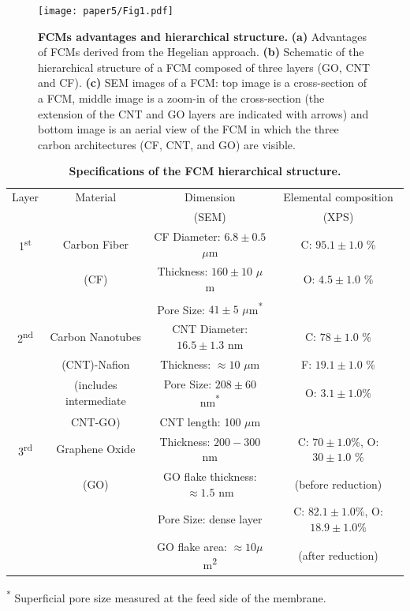 \begin{figure}%
  \centering
  \texttt{[image: paper5/Fig1.pdf]}
  \caption{\textbf{FCMs advantages and hierarchical structure.} \textbf{(a)} Advantages of FCMs derived from the Hegelian approach. \textbf{(b)} Schematic of the hierarchical structure of a FCM composed of three layers (GO, CNT and CF). \textbf{(c)} SEM images of a FCM: top image is a cross-section of a FCM, middle image is a zoom-in of the cross-section (the extension of the CNT and GO layers are indicated with arrows) and bottom image is an aerial view of the FCM in which the three carbon architectures (CF, CNT, and GO) are visible.}
  \label{Fig1_pap5}
\end{figure}


\begin{table}
 \begin{center}
 \caption{\textbf{Specifications of the FCM hierarchical structure.}}
  \label{tbl1_pap5}
  \begin{tabular}{cccc}
        \hline
        Layer & Material & Dimension & Elemental composition\\
         &  & (SEM) & (XPS)\\
        \hline
        1\textsuperscript{st} & Carbon Fiber  & CF Diameter: $6.8\pm0.5$ $\mu$m & C: $95.1\pm1.0$ \%\\
        & (CF) & Thickness: $160\pm10$ $\mu$m & O: $4.5\pm1.0$ \%\\
        &  & Pore Size: $41\pm5$ $\mu$m\textsuperscript{*} & \\
        2\textsuperscript{nd} & Carbon Nanotubes  & CNT Diameter: $16.5\pm1.3$ nm & C: $78\pm1.0$ \%\\
         &(CNT)-Nafion  & Thickness: $\approx10$ $\mu$m & F: $19.1\pm1.0$ \%\\
        &(includes intermediate & Pore Size: $208\pm60$ nm\textsuperscript{*} &O: $3.1\pm1.0$\% \\
        & CNT-GO) & CNT length: 100 $\mu$m &\\
        3\textsuperscript{rd} & Graphene Oxide & Thickness: $200-300$ nm& C: $70\pm1.0$\%, O: $30\pm1.0$ \%\\
         & (GO) & GO flake thickness: $\approx1.5$ nm  &  (before reduction)\\
         &  & Pore Size: dense layer &C: $82.1\pm1.0$\%, O: $18.9\pm1.0$\% \\
         &  & GO flake area: $\approx10$$\mu$m\textsuperscript{2} & (after reduction)\\
        \hline
  \end{tabular}
 \end{center}
 \small
      \item\textsuperscript{*} Superficial pore size measured at the feed side of the membrane.
\end{table}



